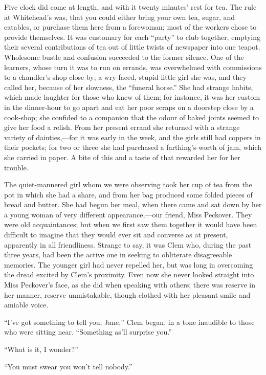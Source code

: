 Five clock did come at length, and with it twenty minutes' rest for tea.
The rule at Whitehead's was, that you could either bring your own tea,
sugar, and eatables, or purchase them here from a forewoman; most of the
workers chose to provide themselves. It was customary for each ``party''
to club together, emptying their several contributions of tea out of
little twists of newspaper into one teapot. Wholesome bustle and
confusion succeeded to the former silence. One of the {}learners, whose
turn it was to run on errands, was overwhelmed with commissions to a
chandler's shop close by; a wry-faced, stupid little girl she was, and
they called her, because of her slowness, the ``funeral horse.'' She had
strange habits, which made laughter for those who knew of them; for
instance, it was her custom in the dinner-hour to go apart and eat her
poor scraps on a doorstep close by a cook-shop; she confided to a
companion that the odour of baked joints seemed to give her food a
relish. From her present errand she returned with a strange variety of
dainties,---for it was early in the week, and the girls still had
coppers in their pockets; for two or three she had purchased a
farthing's-worth of jam, which she carried in paper. A bite of this and
a taste of that rewarded her for her trouble.

The quiet-mannered girl whom we were observing took her cup of tea from
the pot in which she had a share, and from her bag produced some folded
pieces of bread and butter. She had begun her meal, when there came
{}and sat down by her a young woman of very different appearance,---our
friend, Miss Peckover. They were old acquaintances; but when we first
saw them together it would have been difficult to imagine that they
would ever sit and converse as at present, apparently in all
friendliness. Strange to say, it was Clem who, during the past three
years, had been the active one in seeking to obliterate disagreeable
memories. The younger girl had never repelled her, but was long in
overcoming the dread excited by Clem's proximity. Even now she never
looked straight into Miss Peckover's face, as she did when speaking with
others; there was reserve in her manner, reserve unmistakable, though
clothed with her pleasant smile and amiable voice.

``I've got something to tell you, Jane,'' Clem began, in a tone
inaudible to those who were sitting near. ``Something as'll surprise
you.''

``What is it, I wonder?''

``You must swear you won't tell nobody.''

